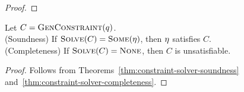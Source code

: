 \begin{proof}
\end{proof}

\begin{theorem}
\label{thm:constraint-solver-sc}
Let $C = \textsc{GenConstraint}(q)$.\\
(Soundness) If $\textsc{Solve}(C) = \textsc{Some}(\eta)$, then $\eta$ satisfies $C$.\\
(Completeness) If $\textsc{Solve}(C) = \textsc{None}$, then $C$ is unsatisfiable.
\end{theorem}

\begin{proof}

Follows from Theorems~\ref{thm:constraint-solver-soundness} and~\ref{thm:constraint-solver-completeness}.

\end{proof}


